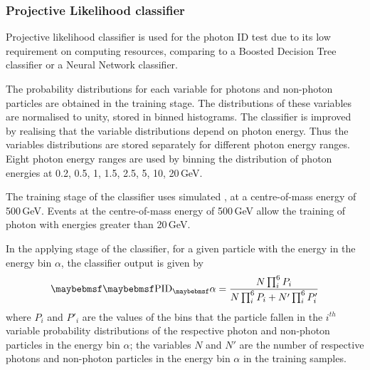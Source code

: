 
\subsubsection{Projective Likelihood classifier}


Projective likelihood classifier   is used  for the photon ID test due to its  low requirement on computing resources, comparing to a Boosted Decision Tree classifier or a Neural Network classifier.

The probability distributions for each variable for photons and non-photon particles are obtained in the training stage. The distributions of these variables are normalised to unity, stored in binned histograms. The classifier is improved by realising that the variable distributions depend on photon energy. Thus the variables distributions are stored separately for different photon energy ranges. Eight photon energy ranges are used by binning the distribution of photon energies at 0.2, 0.5, 1, 1.5, 2.5, 5, 10, 20\,GeV.


The training stage of the classifier uses simulated  \eeZuds, at a centre-of-mass energy of 500\,GeV. Events at the centre-of-mass energy of 500\,GeV allow the training of photon with energies greater than 20\,GeV.


In the applying stage of the classifier, for a given particle with the energy in the  energy bin $\alpha$, the classifier output is given by
\begin{equation}
\uprightMath{PID_\alpha} = \frac{N \prod_{i}^6{P_{i}}}{N \prod_{i}^6{P_{i}} + N' \prod_{i}^6{P'_{i}}}
\end{equation}
where $P_{i}$ and $P'_{i}$ are the values of the bins that the particle fallen in the $i^{th}$ variable probability distributions  of the  respective photon and non-photon particles in the energy bin $\alpha$; the variables $N$ and $N'$ are the number of respective photons and non-photon particles in the energy bin $\alpha$ in the training samples.


